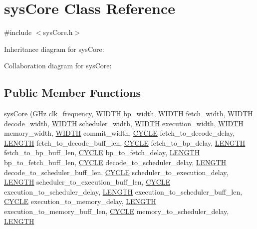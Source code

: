\hypertarget{classsysCore}{
\section{sysCore Class Reference}
\label{classsysCore}
}


{\ttfamily \#include $<$sysCore.h$>$}



Inheritance diagram for sysCore:


Collaboration diagram for sysCore:
\subsection*{Public Member Functions}
\begin{DoxyCompactItemize}
\item 
\hyperlink{classsysCore_a1372d54e87258b1725df6c2b61aaa6fe}{sysCore} (\hyperlink{global_2global_8h_a32516e1b668a88eb546e9b6ee2e3345d}{GHz} clk\_\-frequency, \hyperlink{global_2global_8h_a6fa2e24b8a418fa215e183264cbea3aa}{WIDTH} bp\_\-width, \hyperlink{global_2global_8h_a6fa2e24b8a418fa215e183264cbea3aa}{WIDTH} fetch\_\-width, \hyperlink{global_2global_8h_a6fa2e24b8a418fa215e183264cbea3aa}{WIDTH} decode\_\-width, \hyperlink{global_2global_8h_a6fa2e24b8a418fa215e183264cbea3aa}{WIDTH} scheduler\_\-width, \hyperlink{global_2global_8h_a6fa2e24b8a418fa215e183264cbea3aa}{WIDTH} execution\_\-width, \hyperlink{global_2global_8h_a6fa2e24b8a418fa215e183264cbea3aa}{WIDTH} memory\_\-width, \hyperlink{global_2global_8h_a6fa2e24b8a418fa215e183264cbea3aa}{WIDTH} commit\_\-width, \hyperlink{global_2global_8h_a7e19a550ec11d1ed921deb20c22efb5b}{CYCLE} fetch\_\-to\_\-decode\_\-delay, \hyperlink{global_2global_8h_ad7ec63c69447a2b630929c8e0197860d}{LENGTH} fetch\_\-to\_\-decode\_\-buff\_\-len, \hyperlink{global_2global_8h_a7e19a550ec11d1ed921deb20c22efb5b}{CYCLE} fetch\_\-to\_\-bp\_\-delay, \hyperlink{global_2global_8h_ad7ec63c69447a2b630929c8e0197860d}{LENGTH} fetch\_\-to\_\-bp\_\-buff\_\-len, \hyperlink{global_2global_8h_a7e19a550ec11d1ed921deb20c22efb5b}{CYCLE} bp\_\-to\_\-fetch\_\-delay, \hyperlink{global_2global_8h_ad7ec63c69447a2b630929c8e0197860d}{LENGTH} bp\_\-to\_\-fetch\_\-buff\_\-len, \hyperlink{global_2global_8h_a7e19a550ec11d1ed921deb20c22efb5b}{CYCLE} decode\_\-to\_\-scheduler\_\-delay, \hyperlink{global_2global_8h_ad7ec63c69447a2b630929c8e0197860d}{LENGTH} decode\_\-to\_\-scheduler\_\-buff\_\-len, \hyperlink{global_2global_8h_a7e19a550ec11d1ed921deb20c22efb5b}{CYCLE} scheduler\_\-to\_\-execution\_\-delay, \hyperlink{global_2global_8h_ad7ec63c69447a2b630929c8e0197860d}{LENGTH} scheduler\_\-to\_\-execution\_\-buff\_\-len, \hyperlink{global_2global_8h_a7e19a550ec11d1ed921deb20c22efb5b}{CYCLE} execution\_\-to\_\-scheduler\_\-delay, \hyperlink{global_2global_8h_ad7ec63c69447a2b630929c8e0197860d}{LENGTH} execution\_\-to\_\-scheduler\_\-buff\_\-len, \hyperlink{global_2global_8h_a7e19a550ec11d1ed921deb20c22efb5b}{CYCLE} execution\_\-to\_\-memory\_\-delay, \hyperlink{global_2global_8h_ad7ec63c69447a2b630929c8e0197860d}{LENGTH} execution\_\-to\_\-memory\_\-buff\_\-len, \hyperlink{global_2global_8h_a7e19a550ec11d1ed921deb20c22efb5b}{CYCLE} memory\_\-to\_\-scheduler\_\-delay, \hyperlink{global_2global_8h_ad7ec63c69447a2b630929c8e0197860d}{LENGTH} 
\end{DoxyCompactItemize}
